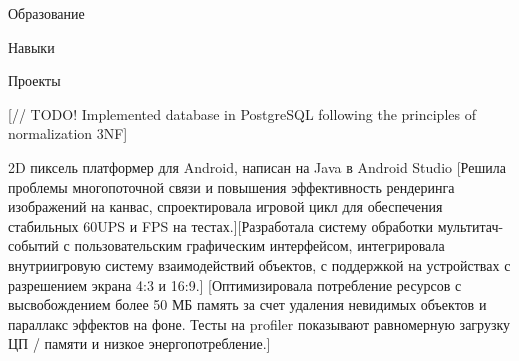 \documentclass[10pt,a4paper,oneside]{letter} %
\begin{document}
	
	
	\begin{contactinfo}
	\end{contactinfo}
	
	\begin{resumeSection}{Образование}


	\end{resumeSection}
	
	\begin{resumeSection}{Навыки}

	\end{resumeSection}
	
	\begin{resumeSection}{Проекты}

		[// TODO! Implemented database in PostgreSQL following the principles of normalization 3NF]
	    
			{2D пиксель платформер для Android, написан на Java в Android Studio}
			[Решила проблемы многопоточной связи и повышения эффективность рендеринга изображений на канвас, спроектировала игровой цикл для обеспечения стабильных 60UPS и FPS на тестах.][Разработала систему обработки мультитач-событий с пользовательским графическим интерфейсом, интегрировала внутриигровую систему взаимодействий объектов, с поддержкой на устройствах с разрешением экрана 4:3 и 16:9.]
			[Оптимизировала потребление ресурсов с высвобождением более 50 МБ память за счет удаления невидимых объектов и параллакс эффектов на фоне. Тесты на profiler показывают равномерную загрузку ЦП / памяти и низкое энергопотребление.]
	\end{resumeSection}
	
\end{document}
